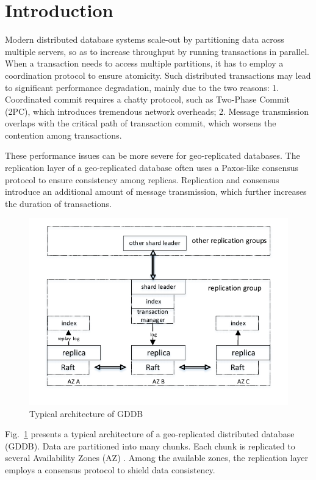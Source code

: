 \documentclass[conference]{IEEEtran}
\begin{document}
\section{Introduction}

Modern distributed database systems scale-out by partitioning data across multiple servers,
so as to increase throughput by running transactions in parallel.
When a transaction needs to access multiple partitions, it has to employ a coordination protocol to ensure atomicity.
Such distributed transactions may lead to significant performance degradation, mainly due to the two reasons\cite{Calvin:conf/sigmod/ThomsonDWRSA12}:
1. Coordinated commit requires a chatty protocol, such as Two-Phase Commit (2PC), which introduces tremendous network overheads;
2. Message transmission overlaps with the critical path of transaction commit, which worsens the contention among transactions.

These performance issues can be more severe for geo-replicated databases.
The replication layer of a geo-replicated database often uses a Paxos-like consensus protocol to ensure consistency among replicas.
Replication and consensus introduce an additional amount of message transmission, which further increases the duration of transactions.


\begin{figure}[tbp]
  \centerline{\includegraphics[scale=0.7]{architecture.pdf}}
  \caption{Typical architecture of GDDB}
  \label{fig:architecture}
\end{figure}

Fig.~\ref{fig:architecture} presents a typical architecture of a geo-replicated distributed database (GDDB).
Data are partitioned into many chunks.
Each chunk is replicated to several Availability Zones (AZ) \cite{Aurora:conf/sigmod/VerbitskiGSCGBM18}.
Among the available zones, the replication layer employs a consensus protocol to shield data consistency.
\end{document}
